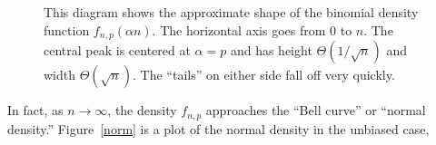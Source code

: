 \documentclass[11pt,twoside]{article}
\begin{document}
\begin{figure}
  \centerline{}
  \caption{This diagram shows the approximate shape of the binomial
    density function $f_{n,p}(\alpha n)$.  The horizontal axis goes from
    0 to $n$.  The central peak is
    centered at $\alpha = p$ and has height
    $\Theta(1/\sqrt{n})$ and width
    $\Theta(\sqrt{n})$.  The ``tails'' on either side fall off very
    quickly.}
  \label{fig:binom}
\end{figure}

\iffalse

In fact, as $n \rightarrow \infty$, the density $f_{n,p}$ approaches the
``Bell curve'' or ``normal density.''  Figure~\ref{norm} is a plot of the
normal density in the unbiased case,
\end{document}
